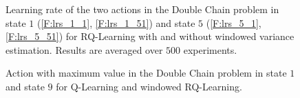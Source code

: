 \documentclass[conference]{IEEEtran}
\begin{document}
\begin{figure}[t]
\begin{minipage}{\textwidth}
\end{minipage}
\caption{Learning rate of the two actions in the Double Chain problem in state $1$ (\ref{F:lrs_1_1}, \ref{F:lrs_1_51}) and state $5$ (\ref{F:lrs_5_1}, \ref{F:lrs_5_51}) for RQ-Learning with and without windowed variance estimation. Results are averaged over $500$ experiments.}
  \label{F:double_chain_lr}
\end{figure}
\begin{figure}[t]
\begin{minipage}{\textwidth}
\centering
\end{minipage}
\caption{Action with maximum value in the Double Chain problem in state $1$ and state $9$ for Q-Learning and windowed RQ-Learning.}
  \label{F:max_a}
\end{figure}
\end{document}
